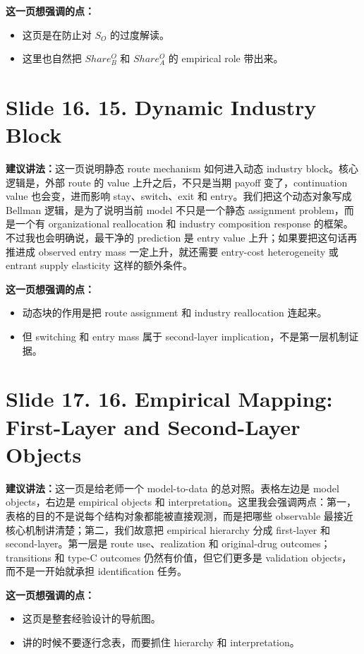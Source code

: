 \documentclass[12pt]{ctexart}
\begin{document}
\vspace{0.5em}
\textbf{这一页想强调的点：}
\begin{itemize}
\item 这页是在防止对 $S_O$ 的过度解读。
\item 这里也自然把 $Share_B^O$ 和 $Share_A^O$ 的 empirical role 带出来。
\end{itemize}

\newpage
\section*{Slide 16. 15. Dynamic Industry Block}
\textbf{建议讲法：}这一页说明静态 route mechanism 如何进入动态 industry block。核心逻辑是，外部 route 的 value 上升之后，不只是当期 payoff 变了，continuation value 也会变，进而影响 stay、switch、exit 和 entry。我们把这个动态对象写成 Bellman 逻辑，是为了说明当前 model 不只是一个静态 assignment problem，而是一个有 organizational reallocation 和 industry composition response 的框架。不过我也会明确说，最干净的 prediction 是 entry value 上升；如果要把这句话再推进成 observed entry mass 一定上升，就还需要 entry-cost heterogeneity 或 entrant supply elasticity 这样的额外条件。

\vspace{0.5em}
\textbf{这一页想强调的点：}
\begin{itemize}
\item 动态块的作用是把 route assignment 和 industry reallocation 连起来。
\item 但 switching 和 entry mass 属于 second-layer implication，不是第一层机制证据。
\end{itemize}

\newpage
\section*{Slide 17. 16. Empirical Mapping: First-Layer and Second-Layer Objects}
\textbf{建议讲法：}这一页是给老师一个 model-to-data 的总对照。表格左边是 model objects，右边是 empirical objects 和 interpretation。这里我会强调两点：第一，表格的目的不是说每个结构对象都能被直接观测，而是把哪些 observable 最接近核心机制讲清楚；第二，我们故意把 empirical hierarchy 分成 first-layer 和 second-layer。第一层是 route use、realization 和 original-drug outcomes；transitions 和 type-C outcomes 仍然有价值，但它们更多是 validation objects，而不是一开始就承担 identification 任务。

\vspace{0.5em}
\textbf{这一页想强调的点：}
\begin{itemize}
\item 这页是整套经验设计的导航图。
\item 讲的时候不要逐行念表，而要抓住 hierarchy 和 interpretation。
\end{itemize}
\end{document}
